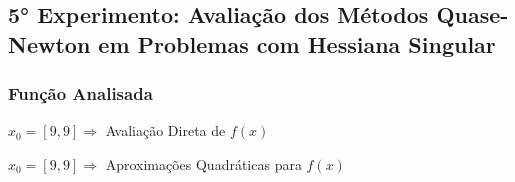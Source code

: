 

\subsection{5° Experimento: Avaliação dos Métodos Quase-Newton em Problemas com Hessiana Singular}
    \subsubsection{Função Analisada}

        \begin{minipage}[h!]{\linewidth}
            \centering
            $x_0=[9,9]\Longrightarrow$  Avaliação Direta de $f(x)$            
            \label{tab:tblz} 
            \writetable{\tblz}\par
            \bigskip
            \centering
            $x_0=[9,9]\Longrightarrow$  Aproximações Quadráticas para $f(x)$
            \label{tab:tblw} 
            \writetable{\tblw}
        \end{minipage}
        
\newpage